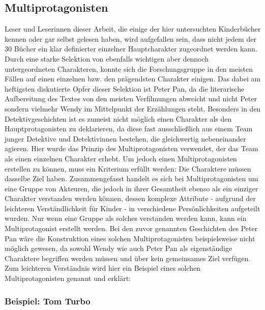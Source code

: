 \subsection{Multiprotagonisten}

Leser und Leserinnen dieser Arbeit, die einige der hier untersuchten
Kinderbücher kennen oder gar selbst gelesen haben, wird aufgefallen
sein, dass nicht jedem der 30 Bücher ein klar definierter einzelner
Hauptcharakter zugeordnet werden kann. Durch eine starke Selektion von
ebenfalls wichtigen aber dennoch untergeordneten Charakteren, konnte
sich die Forschungsgruppe in den meisten Fällen auf einen einzelnen bzw.
den prägendsten Charakter einigen. Das dabei am heftigsten diskutierte
Opfer dieser Selektion ist Peter Pan, da die literarische Aufbereitung
des Textes von den meisten Verfilmungen abweicht und nicht Peter sondern
vielmehr Wendy im Mittelpunkt der Erzählungen steht. Besonders in den
Detektivgeschichten ist es zumeist nicht möglich einen Charakter als den
Hauptprotagonisten zu deklarieren, da diese fast ausschließlich aus
einem Team junger Detektive und Detektivinnen bestehen, die gleichwertig
nebeneinander agieren. Hier wurde das Prinzip des Multiprotagonisten
verwendet, der das Team als einen einzelnen Charakter erhebt. Um jedoch
einen Multiprotagonisten erstellen zu können, muss ein Kriterium erfüllt
werden: Die Charaktere müssen dasselbe Ziel haben. Zusammengefasst
handelt es sich bei Multiprotagonisten um eine Gruppe von Akteuren, die
jedoch in ihrer Gesamtheit ebenso als ein einziger Charakter verstanden
werden können, dessen komplexe Attribute - aufgrund der leichteren
Verständlichkeit für Kinder - in verschiedene Persönlichkeiten
aufgeteilt wurden. Nur wenn eine Gruppe als solches verstanden werden
kann, kann ein Multiprotagonist erstellt werden. Bei den zuvor genannten
Geschichten des Peter Pan wäre die Konstruktion eines solchen
Multiprotagonisten beispielsweise nicht möglich gewesen, da sowohl Wendy
wie auch Peter Pan als eigenständige Charaktere begriffen werden müssen
und über kein gemeinsames Ziel verfügen. Zum leichteren Verständnis wird
hier ein Beispiel eines solchen Multiprotagonisten genannt und erklärt:

\subsubsection{Beispiel: Tom Turbo}

